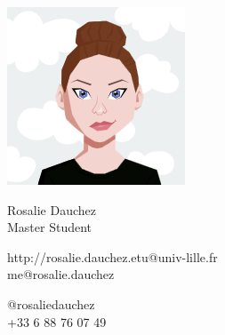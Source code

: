 \documentclass{article}
\begin{document}
\centering \includegraphics[width=.25\linewidth]{AvatarMaker}\\[5pt]
\parbox{2in}{\Large \centering Rosalie Dauchez\\[1pt]
\normalsize Master Student}

\vfill
\raggedright
\begin{multicols}{2}
http://rosalie.dauchez.etu@univ-lille.fr\\
me@rosalie.dauchez

\columnbreak
\raggedleft
@rosaliedauchez\\
+33 6 88 76 07 49%
\end{multicols}%
\end{document}
